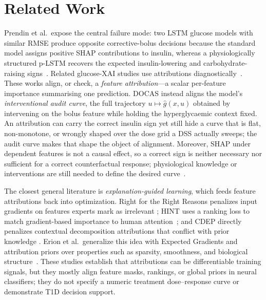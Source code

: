\documentclass[a4paper,fleqn]{cas-sc}
\begin{document}
\section{Related Work}\label{sec:related}

Prendin et al.\ expose the central failure mode: two LSTM glucose models
with similar RMSE produce opposite corrective-bolus decisions because the
standard model assigns positive SHAP contributions to insulin, whereas a
physiologically structured p-LSTM recovers the expected insulin-lowering and
carbohydrate-raising signs~\citep{prendin2023,lundberg2017}. Related glucose-XAI
studies use attributions diagnostically~\citep{zhu2023xai,cappon2020kdh}. These
works align, or check, a \emph{feature attribution}---a scalar per-feature
importance summarising one prediction. DOCAS instead aligns the model's
\emph{interventional audit curve}, the full trajectory
$u\mapsto\hat g(x,u)$ obtained by intervening on the bolus feature while holding
the hyperglycaemic context fixed. An attribution can carry the correct insulin
sign yet still hide a curve that is flat, non-monotone, or wrongly shaped over
the dose grid a DSS actually sweeps; the audit curve makes that shape the
object of alignment. Moreover, SHAP under dependent features is not a causal
effect, so a correct sign is neither necessary nor sufficient for a correct
counterfactual response; physiological knowledge or interventions are still
needed to define the desired curve~\citep{prendin2023,pearl2019tools,geirhos2020,kushner2020}.

The closest general literature is \emph{explanation-guided learning}, which
feeds feature attributions back into optimization. Right for the Right Reasons
penalizes input gradients on features experts mark as irrelevant
\citep{ross2017}; HINT uses a ranking loss to match gradient-based importance to
human attention~\citep{selvaraju2019}; and CDEP directly penalizes contextual
decomposition attributions that conflict with prior knowledge
\citep{rieger2020}. Erion et al.\ generalize this idea with Expected Gradients
and attribution priors over properties such as sparsity, smoothness, and
biological structure~\citep{erion2021}. These studies establish that
attributions can be differentiable training signals, but they mostly align
feature masks, rankings, or global priors in neural classifiers; they do not
specify a numeric treatment dose--response curve or demonstrate T1D decision
support.
\end{document}
